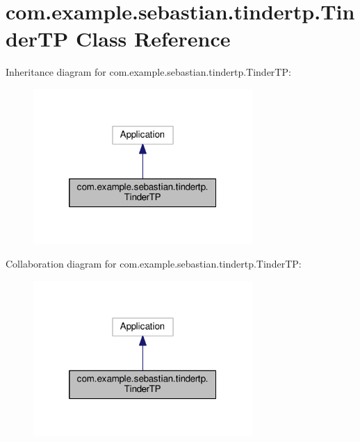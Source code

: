\hypertarget{classcom_1_1example_1_1sebastian_1_1tindertp_1_1TinderTP}{}\section{com.\+example.\+sebastian.\+tindertp.\+Tinder\+TP Class Reference}
\label{classcom_1_1example_1_1sebastian_1_1tindertp_1_1TinderTP}


Inheritance diagram for com.\+example.\+sebastian.\+tindertp.\+Tinder\+TP\+:\nopagebreak
\begin{figure}[H]
\begin{center}
\leavevmode
\includegraphics[width=236pt]{classcom_1_1example_1_1sebastian_1_1tindertp_1_1TinderTP__inherit__graph}
\end{center}
\end{figure}


Collaboration diagram for com.\+example.\+sebastian.\+tindertp.\+Tinder\+TP\+:\nopagebreak
\begin{figure}[H]
\begin{center}
\leavevmode
\includegraphics[width=236pt]{classcom_1_1example_1_1sebastian_1_1tindertp_1_1TinderTP__coll__graph}
\end{center}
\end{figure}
